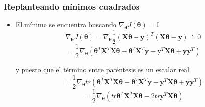 \documentclass{beamer}
\begin{document}
\begin{frame}
\frametitle{Replanteando mínimos cuadrados}
\begin{itemize}
\item El mínimo se encuentra buscando $\nabla_{\boldsymbol{\theta}}J(\boldsymbol{\theta})=0$
\begin{equation*}
\nabla_{\boldsymbol{\theta}}J(\boldsymbol{\theta})=\nabla_{\boldsymbol{\theta}} \frac{1}{2} (\boldsymbol{X\theta}- \boldsymbol{y})^{T} (\boldsymbol{X\theta}- \boldsymbol{y})\doteq 0
\end{equation*}
\begin{equation*}
=\frac{1}{2}\nabla_{\boldsymbol{\theta}}(\boldsymbol{\theta}^T \boldsymbol{X}^T\boldsymbol{X} \boldsymbol{\theta}-\boldsymbol{\theta}^T \boldsymbol{X}^T \boldsymbol{y}-  \boldsymbol{y}^T \boldsymbol{X} \boldsymbol{\theta} +  \boldsymbol{y}\boldsymbol{y}^T)
\end{equation*}

y puesto que el término entre paréntesis es un escalar real
\begin{equation*}
=\frac{1}{2}\nabla_{\boldsymbol{\theta}} tr(\boldsymbol{\theta}^T \boldsymbol{X}^T\boldsymbol{X} \boldsymbol{\theta}-\boldsymbol{\theta}^T \boldsymbol{X}^T \boldsymbol{y}-  \boldsymbol{y}^T \boldsymbol{X} \boldsymbol{\theta} +  \boldsymbol{y}\boldsymbol{y}^T)
\end{equation*}
\begin{equation*}
=\frac{1}{2}\nabla_{\boldsymbol{\theta}}(tr\boldsymbol{\theta}^T \boldsymbol{X}^T\boldsymbol{X} \boldsymbol{\theta}- 2tr \boldsymbol{y}^T \boldsymbol{X} \boldsymbol{\theta})
\end{equation*}
\end{itemize}
\end{frame}
\end{document}
